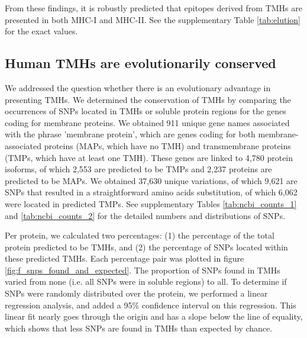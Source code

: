 From these findings, it is robustly predicted that
epitopes derived from TMHs are presented in both MHC-I and MHC-II.
See the supplementary Table \ref{tab:elution} for the exact values.

\subsection{Human TMHs are evolutionarily conserved}


We addressed the question whether there is an evolutionary advantage in presenting TMHs.
We determined the conservation of TMHs 
by comparing the occurrences of SNPs located in TMHs or soluble protein regions 
for the genes coding for membrane proteins.
We obtained 911 unique gene names associated with the phrase 'membrane protein',
which are genes coding for both membrane-associated proteins (MAPs, which have no TMH) and 
transmembrane proteins (TMPs, which have at least one TMH).
These genes are linked to 4,780 protein isoforms, 
of which 2,553 are predicted to be TMPs and 
2,237 proteins are predicted to be MAPs.
We obtained 37,630 unique variations, 
of which 9,621 are SNPs that resulted in a straightforward amino acids substitution, 
of which 6,062 were located in predicted TMPs.
See supplementary Tables \ref{tab:ncbi_counts_1} and \ref{tab:ncbi_counts_2} 
for the detailed numbers and distributions of SNPs.

Per protein, we calculated two percentages: 
(1) the percentage of the total protein predicted to be TMHs, 
and (2) the percentage of SNPs located within these predicted TMHs.
Each percentage pair was plotted in figure \ref{fig:f_snps_found_and_expected}.
The proportion of SNPs found in TMHs varied from 
none (i.e. all SNPs were in
soluble regions) to all.
To determine if SNPs were randomly distributed over the protein, we performed a linear regression analysis,
and added a 95\% confidence interval on this regression.
This linear fit nearly goes through the origin and has a slope
below the line of equality,
which shows that less SNPs are found in TMHs than expected by chance.


